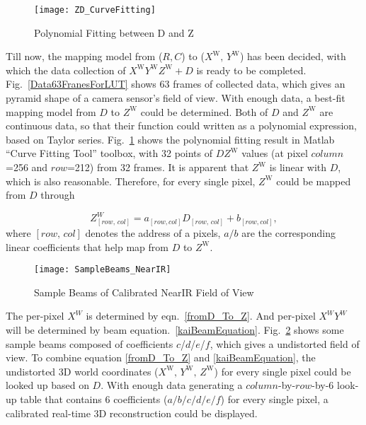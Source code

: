 %
\begin{figure}[t]
\centering
\texttt{[image: ZD\_CurveFitting]}
\caption{Polynomial Fitting between D and Z}
\label{ZD_CurveFitting}
\end{figure}%
%
Till now, the mapping model from (\(R, C\)) to (\(X^\text{W}, \, Y^\text{W}\)) has been decided, with which the data collection of \(X^\text{W}Y^\text{W}Z^\text{W}+D\) is ready to be completed. Fig.~\ref{Data63FranesForLUT} shows 63 frames of collected data, which gives an pyramid shape of a camera sensor's field of view. With enough data, a best-fit mapping model from \(D\) to \(Z^\text{W}\) could be determined. Both of \(D\) and \(Z^\text{W}\) are continuous data, so that their function could written as a polynomial expression, based on Taylor series. Fig.~\ref{ZD_CurveFitting} shows the polynomial fitting result in Matlab \enquote{Curve Fitting Tool} toolbox, with 32 points of \(DZ^\text{W}\) values (at pixel \(column\)=256 and \(row\)=212) from 32 frames. It is apparent that \(Z^\text{W}\) is linear with \(D\), which is also reasonable. Therefore, for every single pixel, \(Z^\text{W}\) could be mapped from \(D\) through \par
%
\begin{equation}
Z^W_{[row, \, col]} = a_{[row, col]}D_{[row, \, col]}+b_{[row, col]} ,
\label{fromD_To_Z}
\end{equation}%
%
\noindent
where \({[row, \, col]}\) denotes the address of a pixels, \(a/b\) are the corresponding linear coefficients that help map from \(D\) to \(Z^\text{W}\). 
\\\indent%
%
\begin{figure}[t]
\centering
\texttt{[image: SampleBeams\_NearIR]}
\caption{Sample Beams of Calibrated NearIR Field of View}
\label{SampleBeams_NearIR}
\end{figure}
%
The per-pixel \(X^W\) is determined by eqn.~\ref{fromD_To_Z}. And per-pixel \(X^WY^W\) will be determined by beam equation.~\ref{kaiBeamEquation}. Fig.~\ref{SampleBeams_NearIR} shows some sample beams composed of coefficients \(c\)/\(d\)/\(e\)/\(f\), which gives a undistorted field of view. To combine equation \ref{fromD_To_Z} and \ref{kaiBeamEquation}, the undistorted 3D world coordinates (\(X^\text{W}, \, Y^\text{W}, \, Z^\text{W}\)) for every single pixel could be looked up based on \(D\). With enough data generating a \(column\)-by-\(row\)-by-\(6\) look-up table that contains 6 coefficients (\(a/b/c/d/e/f\)) for every single pixel, a calibrated real-time 3D reconstruction could be displayed.
%
%
%
%

